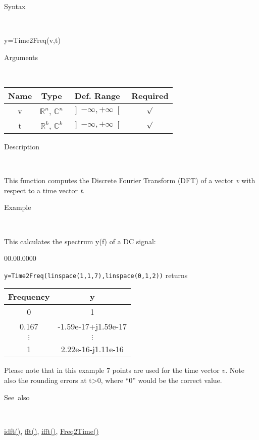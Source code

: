 \begin{description}
\item [Syntax]~
\end{description}
y=Time2Freq(v,t)

\begin{description}
\item [Arguments]~
\end{description}
\begin{tabular}{|c|c|c|c|}
\hline 
Name&
Type&
Def. Range&
Required\tabularnewline
\hline
\hline 
v&
$\mathbb{R}^{n}$, $\mathbb{C}^{n}$&
$\left]-\infty,+\infty\right[$&
$\surd$\tabularnewline
\hline 
t&
$\mathbb{R}^{k}$, $\mathbb{C}^{k}$&
$\left]-\infty,+\infty\right[$&
$\surd$\tabularnewline
\hline
\end{tabular}

\begin{description}
\item [Description]~
\end{description}
This function computes the Discrete Fourier Transform (DFT) of a vector
\textit{v} with respect to a time vector \textit{t}.

\begin{description}
\item [Example]~
\end{description}
This calculates the spectrum y(f) of a DC signal:

\begin{lyxlist}{00.00.0000}
\item [\texttt{y=Time2Freq(linspace(1,1,7),linspace(0,1,2))}]returns\\

\begin{tabular}{|c|c|}
\hline 
Frequency&
y\tabularnewline
\hline
\hline 
0&
1\tabularnewline
\hline 
0.167&
-1.59e-17+j1.59e-17\tabularnewline
\hline 
$\vdots$&
$\vdots$\tabularnewline
\hline 
1&
2.22e-16-j1.11e-16\tabularnewline
\hline
\end{tabular}
\end{lyxlist}
Please note that in this example 7 points are used for the time vector
$v$.  Note also the rounding errors at t>0, where {}``0'' would be the
correct value.

\begin{description}
\item [See~also]~
\end{description}
\textcolor{blue}{\hyperlink{idft}{idft()}}\textcolor{black}{,} \textcolor{blue}{\hyperlink{fft}{fft()}}\textcolor{black}{,}
\textcolor{blue}{\hyperlink{ifft}{ifft()}}\textcolor{black}{,}
\textcolor{blue}{\hyperlink{Freq2Time}{Freq2Time()}}

